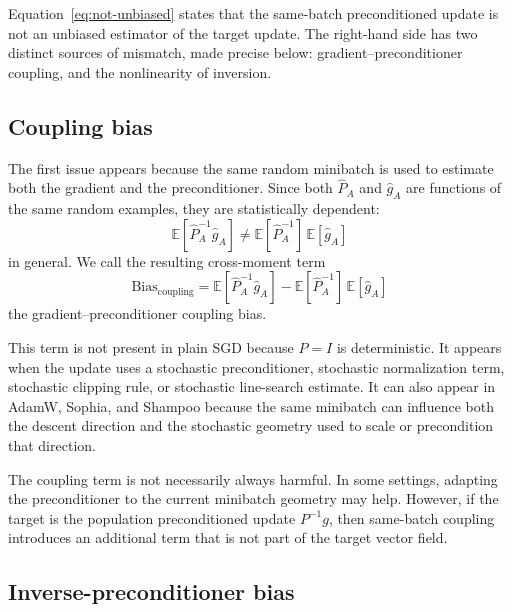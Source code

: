 \documentclass{article}
\newcommand{\E}{\mathbb{E}}
\begin{document}
Equation~\eqref{eq:not-unbiased} states that the same-batch preconditioned update is not an unbiased estimator of the target update. The right-hand side has two distinct sources of mismatch, made precise below: gradient--preconditioner coupling, and the nonlinearity of inversion.

\subsection{Coupling bias}
\label{sec:coupling-bias}

The first issue appears because the same random minibatch is used to estimate both the gradient and the preconditioner. Since both $\hat P_A$ and $\hat g_A$ are functions of the same random examples, they are statistically dependent:
\begin{equation}
    \E[\hat P_A^{-1}\hat g_A]
    \neq
    \E[\hat P_A^{-1}]\,\E[\hat g_A]
\end{equation}
in general. We call the resulting cross-moment term
\begin{equation}
    \mathrm{Bias}_{\mathrm{coupling}}
    =
    \E[\hat P_A^{-1}\hat g_A]
    -
    \E[\hat P_A^{-1}]\,\E[\hat g_A]
    \label{eq:coupling-bias}
\end{equation}
the gradient--preconditioner coupling bias.

This term is not present in plain SGD because $P=I$ is deterministic. It appears when the update uses a stochastic preconditioner, stochastic normalization term, stochastic clipping rule, or stochastic line-search estimate. It can also appear in AdamW, Sophia, and Shampoo because the same minibatch can influence both the descent direction and the stochastic geometry used to scale or precondition that direction.

The coupling term is not necessarily always harmful. In some settings, adapting the preconditioner to the current minibatch geometry may help. However, if the target is the population preconditioned update $P^{-1}g$, then same-batch coupling introduces an additional term that is not part of the target vector field.

\subsection{Inverse-preconditioner bias}
\label{sec:inverse-bias}
\end{document}
